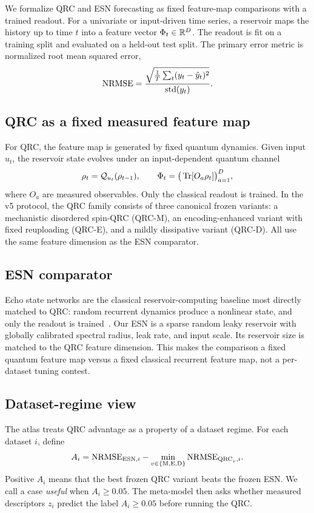 We formalize QRC and ESN forecasting as fixed feature-map comparisons with a trained readout. For a univariate or input-driven time series, a reservoir maps the history up to time \(t\) into a feature vector \(\Phi_t\in\mathbb{R}^D\). The readout is fit on a training split and evaluated on a held-out test split. The primary error metric is normalized root mean squared error,
\begin{equation}
    \mathrm{NRMSE} =
    \frac{\sqrt{\frac{1}{T}\sum_t (y_t-\hat y_t)^2}}
    {\operatorname{std}(y_t)} .
    \label{eq:nrmse}
\end{equation}

\subsection{QRC as a fixed measured feature map}

For QRC, the feature map is generated by fixed quantum dynamics. Given input \(u_t\), the reservoir state evolves under an input-dependent quantum channel
\begin{equation}
    \rho_t = \mathcal{Q}_{u_t}(\rho_{t-1}),
    \qquad
    \Phi_t =
    \big(\operatorname{Tr}[O_a\rho_t]\big)_{a=1}^{D},
    \label{eq:qrc-feature}
\end{equation}
where \(O_a\) are measured observables. Only the classical readout is trained. In the v5 protocol, the QRC family consists of three canonical frozen variants: a mechanistic disordered spin-QRC (QRC-M), an encoding-enhanced variant with fixed reuploading (QRC-E), and a mildly dissipative variant (QRC-D). All use the same feature dimension as the ESN comparator.

\subsection{ESN comparator}

Echo state networks are the classical reservoir-computing baseline most directly matched to QRC: random recurrent dynamics produce a nonlinear state, and only the readout is trained~\cite{jaeger2004harnessing,lukosevicius2009reservoir}. Our ESN is a sparse random leaky reservoir with globally calibrated spectral radius, leak rate, and input scale. Its reservoir size is matched to the QRC feature dimension. This makes the comparison a fixed quantum feature map versus a fixed classical recurrent feature map, not a per-dataset tuning contest.

\subsection{Dataset-regime view}

The atlas treats QRC advantage as a property of a dataset regime. For each dataset \(i\), define
\begin{equation}
    A_i =
    \mathrm{NRMSE}_{\mathrm{ESN},i}
    -
    \min_{v\in\{\mathrm{M,E,D}\}}\mathrm{NRMSE}_{\mathrm{QRC}_v,i}.
    \label{eq:advantage}
\end{equation}
Positive \(A_i\) means that the best frozen QRC variant beats the frozen ESN. We call a case \emph{useful} when \(A_i\geq 0.05\). The meta-model then asks whether measured descriptors \(z_i\) predict the label \(A_i\geq 0.05\) before running the QRC.

